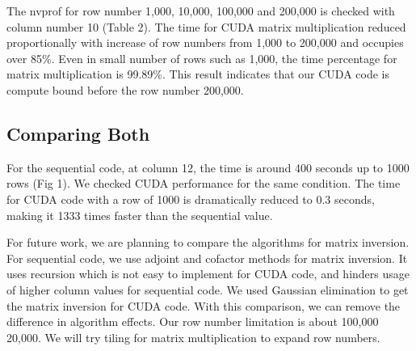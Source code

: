 \documentclass[letterpaper, 10 pt, conference]{ieeeconf}  %
\begin{document}
The nvprof for row number 1,000, 10,000, 100,000 and 200,000 is checked with column number 10 (Table 2). The time for CUDA matrix multiplication reduced proportionally with increase of row numbers from 1,000 to 200,000 and occupies over 85\%. Even in small number of rows such as 1,000, the time percentage for matrix multiplication is 99.89\%. This result indicates that our CUDA code is compute bound before the row number 200,000. 


\subsection{Comparing Both}

For the sequential code, at column 12, the time is around 400 seconds up to 1000 rows (Fig 1). We checked CUDA performance for the same condition. The time for CUDA code with a row of 1000 is dramatically reduced to 0.3 seconds, making it 1333 times faster than the sequential value.

For future work, we are planning to compare the algorithms for matrix inversion. For sequential code, we use adjoint and cofactor methods for matrix inversion. It uses recursion which is not easy to implement for CUDA code, and hinders usage of higher column values for sequential code. We used Gaussian elimination to get the matrix inversion for CUDA code. With this comparison, we can remove the difference in algorithm effects. Our row number limitation is about 100,000 ~ 20,000. We will try tiling for matrix multiplication to expand row numbers.  
\end{document}
